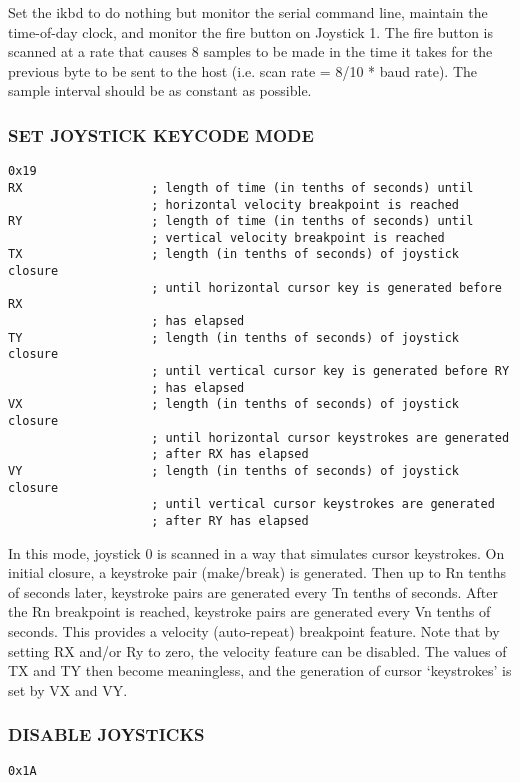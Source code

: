 \documentclass[a4paper,8pt,english]{sphinxmanual}
\begin{document}
Set the ikbd to do nothing but monitor the serial command line, maintain the
time-of-day clock, and monitor the fire button on Joystick 1. The fire button
is scanned at a rate that causes 8 samples to be made in the time it takes for
the previous byte to be sent to the host (i.e. scan rate = 8/10 * baud rate).
The sample interval should be as constant as possible.


\subsubsection{SET JOYSTICK KEYCODE MODE}
\label{input/devices/atarikbd:set-joystick-keycode-mode}
\begin{Verbatim}[commandchars=\\\{\}]
0x19
RX                  ; length of time (in tenths of seconds) until
                    ; horizontal velocity breakpoint is reached
RY                  ; length of time (in tenths of seconds) until
                    ; vertical velocity breakpoint is reached
TX                  ; length (in tenths of seconds) of joystick closure
                    ; until horizontal cursor key is generated before RX
                    ; has elapsed
TY                  ; length (in tenths of seconds) of joystick closure
                    ; until vertical cursor key is generated before RY
                    ; has elapsed
VX                  ; length (in tenths of seconds) of joystick closure
                    ; until horizontal cursor keystrokes are generated
                    ; after RX has elapsed
VY                  ; length (in tenths of seconds) of joystick closure
                    ; until vertical cursor keystrokes are generated
                    ; after RY has elapsed
\end{Verbatim}

In this mode, joystick 0 is scanned in a way that simulates cursor keystrokes.
On initial closure, a keystroke pair (make/break) is generated. Then up to Rn
tenths of seconds later, keystroke pairs are generated every Tn tenths of
seconds. After the Rn breakpoint is reached, keystroke pairs are generated
every Vn tenths of seconds. This provides a velocity (auto-repeat) breakpoint
feature.
Note that by setting RX and/or Ry to zero, the velocity feature can be
disabled. The values of TX and TY then become meaningless, and the generation
of cursor `keystrokes' is set by VX and VY.


\subsubsection{DISABLE JOYSTICKS}
\label{input/devices/atarikbd:disable-joysticks}
\begin{Verbatim}[commandchars=\\\{\}]
0x1A
\end{Verbatim}
\end{document}
